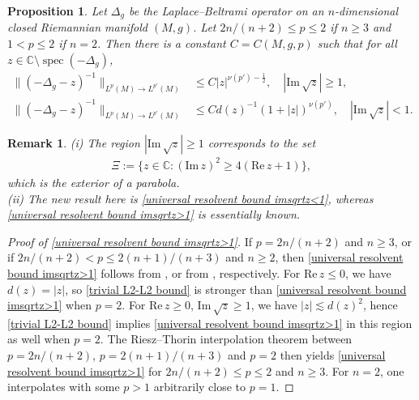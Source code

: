 \documentclass[12pt]{amsart}
\newcommand{\C}{{\mathbb C}}
\newcommand\re{\mathrm{Re}\,}
\newcommand\im{\mathrm{Im}\,}
\DeclareMathOperator{\spec}{spec}
\newtheorem{proposition}[theorem]{Proposition}
\newtheorem{remark}[theorem]{Remark}
\begin{document}
\begin{proposition}\label{prop. Lp to Lp' resolvent estimate}
    Let $\Delta_g$ be the Laplace--Beltrami operator on an $n$-dimensional closed Riemannian manifold $(M,g)$. Let $2n/(n+2)\leq p\leq 2$ if $n\geq 3$ and $1<p\leq 2$ if $n=2$.
    Then there is a constant $C=C(M,g,p)$ such that for all $z\in \C\setminus\spec(-\Delta_g)$,
\begin{align}
\|(-\Delta_g-z)^{-1}\|_{L^{p}(M)\to L^{p'}(M)}
&\leq C |z|^{\nu(p')-\frac{1}{2}},\quad |\im\sqrt{z}|\geq 1,\label{universal resolvent bound imsqrtz>1}\\
\|(-\Delta_g-z)^{-1}\|_{L^{p}(M)\to L^{p'}(M)}
&\leq C d(z)^{-1}(1+ |z|)^{\nu(p')},\quad |\im\sqrt{z}|< 1.\label{universal resolvent bound imsqrtz<1}
\end{align}  
\end{proposition}

\begin{remark}
(i) The region $|\im\sqrt{z}|\geq 1$ corresponds to the set
 \begin{align}\label{Xi}
     \Xi:=\{z\in\C:(\im z)^2\geq 4(\re z+1)\},
 \end{align}
which is the exterior of a parabola.\\

\noindent (ii) The new result here is \eqref{universal resolvent bound imsqrtz<1}, whereas \eqref{universal resolvent bound imsqrtz>1} is essentially known. 
\end{remark}

\begin{proof}[Proof of \eqref{universal resolvent bound imsqrtz>1}]
    If $p=2n/(n+2)$ and $n\geq 3$, or if $2n/(n+2)< p\leq 2(n+1)/(n+3)$ and $n\geq 2$, then \eqref{universal resolvent bound imsqrtz>1} follows from \cite{MR3200351}, or from \cite[Theorem 1 and Remark 9]{MR3620715}, respectively. For $\re z\leq 0$, we have $d(z)=|z|$, so \eqref{trivial L2-L2 bound} is stronger than \eqref{universal resolvent bound imsqrtz>1} when $p=2$. For $\re z\geq 0$, $\im\sqrt{z}\geq 1$, we have $|z|\lesssim d(z)^2$, hence \eqref{trivial L2-L2 bound} implies \eqref{universal resolvent bound imsqrtz>1} in this region as well when $p=2$. The Riesz–Thorin interpolation theorem between $p=2n/(n+2)$, $p=2(n+1)/(n+3)$ and $p=2$ then yields \eqref{universal resolvent bound imsqrtz>1} for $2n/(n+2)\leq p\leq 2$ and $n\geq 3$. For $n=2$, one interpolates with some $p>1$ arbitrarily close to $p=1$.
\end{proof}
 
\end{document}

